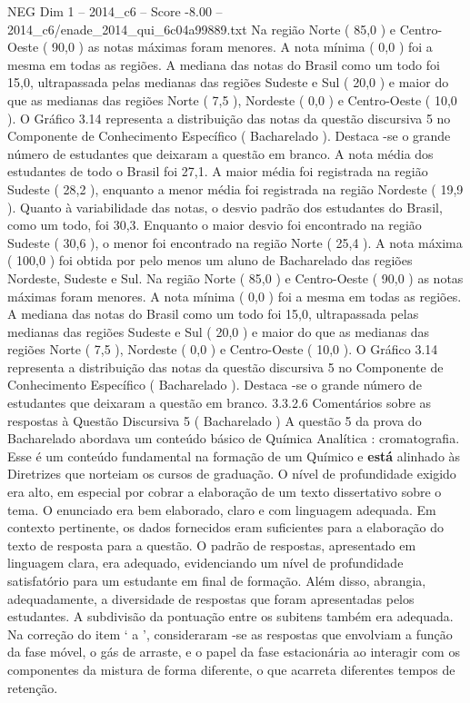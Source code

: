 \begin{textsample}{NEG Dim 1 – 2014\_c6 – Score -8.00 – 2014\_c6/enade\_2014\_qui\_6c04a99889.txt}
Na região Norte ( 85,0 ) e Centro-Oeste ( 90,0 ) as notas máximas foram menores.
A nota mínima ( 0,0 ) foi a mesma em todas as regiões.
A mediana das notas do Brasil como um todo foi 15,0, ultrapassada pelas medianas das regiões Sudeste e Sul ( 20,0 ) e maior do que as medianas das regiões Norte ( 7,5 ), Nordeste ( 0,0 ) e Centro-Oeste ( 10,0 ).
O Gráfico 3.14 representa a distribuição das notas da questão discursiva 5 no Componente de Conhecimento Específico ( Bacharelado ).
Destaca -se o grande número de estudantes que deixaram a questão em branco.
A nota média dos estudantes de todo o Brasil foi 27,1.
A maior média foi registrada na região Sudeste ( 28,2 ), enquanto a menor média foi registrada na região Nordeste ( 19,9 ).
Quanto à variabilidade das notas, o desvio padrão dos estudantes do Brasil, como um todo, foi 30,3.
Enquanto o maior desvio foi encontrado na região Sudeste ( 30,6 ), o menor foi encontrado na região Norte ( 25,4 ).
A nota máxima ( 100,0 ) foi obtida por pelo menos um aluno de Bacharelado das regiões Nordeste, Sudeste e Sul.
Na região Norte ( 85,0 ) e Centro-Oeste ( 90,0 ) as notas máximas foram menores.
A nota mínima ( 0,0 ) foi a mesma em todas as regiões.
A mediana das notas do Brasil como um todo foi 15,0, ultrapassada pelas medianas das regiões Sudeste e Sul ( 20,0 ) e maior do que as medianas das regiões Norte ( 7,5 ), Nordeste ( 0,0 ) e Centro-Oeste ( 10,0 ).
O Gráfico 3.14 representa a distribuição das notas da questão discursiva 5 no Componente de Conhecimento Específico ( Bacharelado ).
Destaca -se o grande número de estudantes que deixaram a questão em branco. 3.3.2.6 Comentários sobre as respostas à Questão Discursiva 5 ( Bacharelado ) A questão 5 da prova do Bacharelado abordava um conteúdo básico de Química Analítica : cromatografia.
Esse é um conteúdo fundamental na formação de um Químico e \textbf{está} alinhado às Diretrizes que norteiam os cursos de graduação.
O nível de profundidade exigido era alto, em especial por cobrar a elaboração de um texto dissertativo sobre o tema.
O enunciado era bem elaborado, claro e com linguagem adequada.
Em contexto pertinente, os dados fornecidos eram suficientes para a elaboração do texto de resposta para a questão.
O padrão de respostas, apresentado em linguagem clara, era adequado, evidenciando um nível de profundidade satisfatório para um estudante em final de formação.
Além disso, abrangia, adequadamente, a diversidade de respostas que foram apresentadas pelos estudantes.
A subdivisão da pontuação entre os subitens também era adequada.
Na correção do item ‘ a ’, consideraram -se as respostas que envolviam a função da fase móvel, o gás de arraste, e o papel da fase estacionária ao interagir com os componentes da mistura de forma diferente, o que acarreta diferentes tempos de retenção.

\end{textsample}

